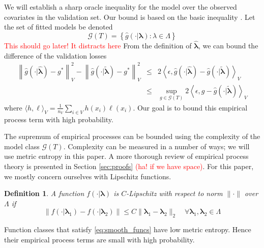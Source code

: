 \documentclass[12pt]{article}
\newtheorem{definition}{Definition}
\begin{document}
We will establish a sharp oracle inequality for the model over the observed covariates in the validation set. Our bound is based on the basic inequality \citep{van2000empirical}.  Let the set of fitted models be denoted
\begin{equation}
\label{function_class_GT}
\mathcal{G}(T) = \left \{ \hat{g}(\cdot | \boldsymbol \lambda) : \lambda \in \Lambda  \right \}
\end{equation}
\textcolor{red}{This should go later! It distracts here} From the definition of $\hat{\boldsymbol \lambda}$, we can bound the difference of the validation losses
\begin{eqnarray}
\label{basic_ineq}
\left \|\hat{g}(\cdot | \hat{\boldsymbol \lambda}) - g^* \right \|_V^2 - \left \| \hat{g}(\cdot | \tilde{\boldsymbol \lambda}) - g^* \right \|_V^2
& \le &
2 \left \langle \epsilon, \hat{g}(\cdot | \hat{\boldsymbol \lambda}) - \hat{g}(\cdot | \tilde{\boldsymbol \lambda}) \right \rangle_V \\
& \le &
\sup_{g \in \mathcal{G}(T)} 2 \left \langle \epsilon, g - \hat{g}(\cdot | \tilde{\boldsymbol \lambda}) \right \rangle_V
\label{eq:basic_ineq_emp_process}
\end{eqnarray}
where $\langle h, \ell \rangle_V = \frac{1}{n_V}\sum_{i\in V} h(x_i) \ell(x_i)$. Our goal is to bound this empirical process term with high probability.

The supremum of empirical processes can be bounded using the complexity of the model class $\mathcal{G}(T)$. Complexity can be measured in a number of ways; we will use metric entropy in this paper. A more thorough review of empirical process theory is presented in Section \ref{sec:proofs} \textcolor{red}{(ha! if we have space)}. For this paper, we mostly concern ourselves with Lipschitz functions.
\begin{definition}
\label{def:smooth_funcs}
A function $f(\cdot | \boldsymbol{\lambda})$ is $C$-Lipschitz with respect to norm $\| \cdot \|$ over $\Lambda$ if
\begin{equation}
\left \| f(\cdot | \boldsymbol \lambda_1) - f(\cdot | \boldsymbol \lambda_2) \right \|
\le
C \| \boldsymbol \lambda_1 - \boldsymbol \lambda_2 \|_2 
\quad
\forall \boldsymbol \lambda_1,\boldsymbol \lambda_2 \in \Lambda
\label{eq:smooth_funcs}
\end{equation}
\end{definition}
Function classes that satisfy \eqref{eq:smooth_funcs} have low metric entropy. Hence their empirical process terms are small with high probability.
\end{document}
